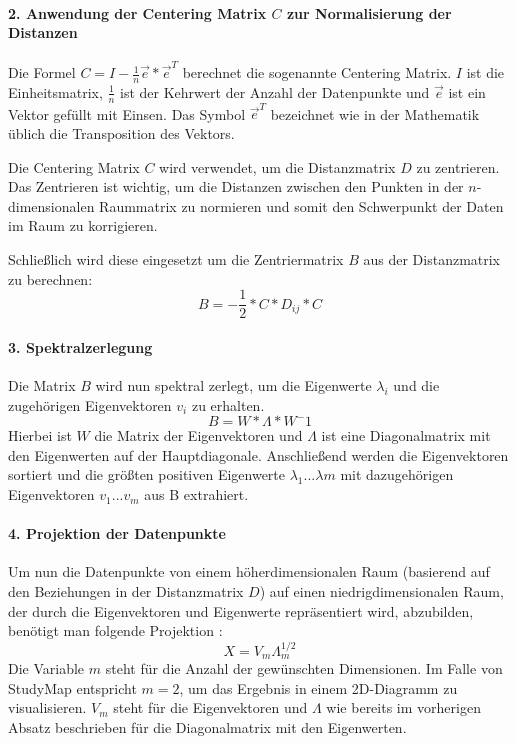 \paragraph*{2. Anwendung der Centering Matrix $ C $ zur Normalisierung der
Distanzen}
Die Formel $ C = I - \frac{1}{n} \vec{e} * \vec{e}^T $ berechnet die sogenannte Centering Matrix. $ I $ ist die Einheitsmatrix, $ \frac{1}{n} $ ist der Kehrwert der Anzahl der Datenpunkte und $ \vec{e} $ ist ein Vektor gefüllt mit Einsen. Das Symbol $ \vec{e}^T $ bezeichnet wie in der Mathematik üblich die Transposition des Vektors. \parencite{wickelmaier_introduction_2003}

Die Centering Matrix $ C $ wird verwendet, um die Distanzmatrix $ D $ zu
zentrieren. Das Zentrieren ist wichtig, um die Distanzen zwischen den Punkten
in der $n$-dimensionalen Raummatrix zu normieren und somit den Schwerpunkt der
Daten im Raum zu korrigieren. \parencite{wickelmaier_introduction_2003}

Schließlich wird diese eingesetzt um die Zentriermatrix $ B $ aus der
Distanzmatrix zu berechnen:
$$ B = - \frac{1}{2} * C * D_{ij} * C $$

\paragraph*{3. Spektralzerlegung}
Die Matrix $ B $ wird nun spektral zerlegt, um die Eigenwerte $ \lambda_{i} $ und die zugehörigen Eigenvektoren $ v_{i} $ zu erhalten. $$ B = W * \Lambda * W^-1 $$ Hierbei ist $ W $ die Matrix der Eigenvektoren und $ \Lambda $ ist eine Diagonalmatrix mit den Eigenwerten auf der Hauptdiagonale. Anschließend werden die Eigenvektoren sortiert und die größten positiven Eigenwerte $ \lambda_{1} ... \lambda{m} $ mit dazugehörigen Eigenvektoren $ v_{1} ... v_{m} $ aus B extrahiert. \parencite{wickelmaier_introduction_2003}

\paragraph*{4. Projektion der Datenpunkte}
Um nun die Datenpunkte von einem höherdimensionalen Raum (basierend auf den
Beziehungen in der Distanzmatrix $ D $) auf einen niedrigdimensionalen Raum,
der durch die Eigenvektoren und Eigenwerte repräsentiert wird, abzubilden,
benötigt man folgende Projektion \parencite{he_classical_2018}:
$$ X = V_m \Lambda^{1/2}_m $$
Die Variable $ m $ steht für die Anzahl der gewünschten Dimensionen. Im Falle
von StudyMap entspricht $ m = 2 $, um das Ergebnis in einem 2D-Diagramm zu
visualisieren. $ V_{m} $ steht für die Eigenvektoren und $ \Lambda $ wie bereits
im vorherigen Absatz beschrieben für die Diagonalmatrix mit den Eigenwerten.
\parencite{wickelmaier_introduction_2003}

